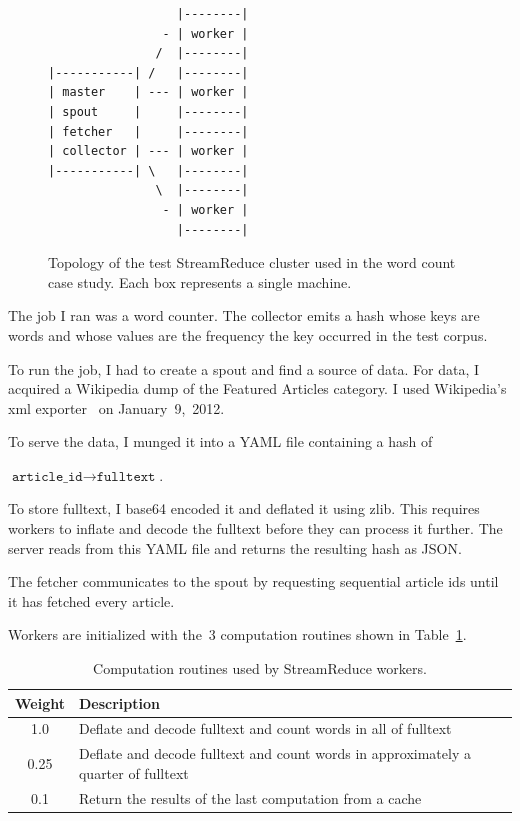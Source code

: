 \documentclass[12pt,twocolumn]{article}
\begin{document}
\begin{figure}
\begin{verbatim}
                  |--------|
                - | worker |
               /  |--------|
|-----------| /   |--------|
| master    | --- | worker |
| spout     |     |--------|
| fetcher   |     |--------|
| collector | --- | worker |
|-----------| \   |--------|
               \  |--------|
                - | worker |
                  |--------|
\end{verbatim}
\caption{Topology of the test StreamReduce cluster used in the word count case study. Each box represents a single machine.}
\label{fig:clusterDiagram}
\end{figure}

The job I ran was a word counter. The collector emits a hash whose keys are words and whose
values are the frequency the key occurred in the test corpus.

To run the job, I had to create a spout and find a source of data. For data, I acquired a
Wikipedia dump of the Featured Articles category. I used Wikipedia's xml
exporter~\cite{wikipedia:special:export} on January~9,~2012.

To serve the data, I munged it into a YAML file containing a hash of
\begin{center}
$\texttt{article\_id}\rightarrow\texttt{fulltext}$.
\end{center}
To store fulltext, I base64 encoded it and
deflated it using zlib. This requires workers to inflate and decode the fulltext before they
can process it further. The server reads from this YAML file and returns the resulting hash as
JSON.

The fetcher communicates to the spout by requesting sequential article ids until it has fetched
every article.

Workers are initialized with the~3 computation routines shown in Table~\ref{table:workerTasks}.

\begin{table}
\begin{tabularx}{\linewidth}{|c|X|}
 \hline
Weight & Description \\ \hline
1.0 & Deflate and decode fulltext and count words in all of fulltext \\ \hline
0.25 & Deflate and decode fulltext and count words in approximately a quarter of fulltext \\ \hline
0.1 & Return the results of the last computation from a cache \\ \hline
\end{tabularx}
\caption{Computation routines used by StreamReduce workers.}
\label{table:workerTasks}
\end{table}
\end{document}
